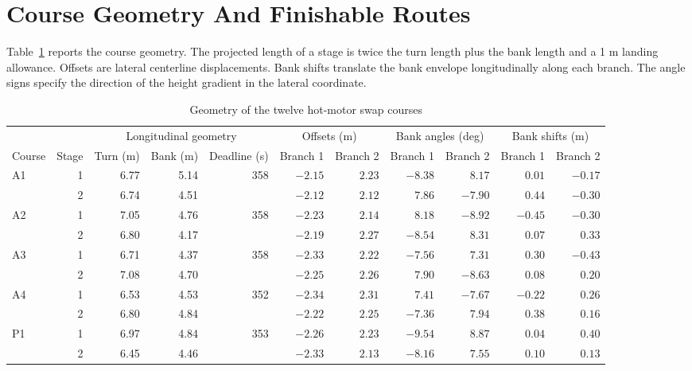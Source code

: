 \documentclass{ieeeaccess}
\begin{document}
\appendices

\section{Course Geometry And Finishable Routes}
\label{app:course-data}

Table~\ref{tab:geometry} reports the course geometry. The projected length of a stage is twice the turn length plus the bank length and a 1 m landing allowance. Offsets are lateral centerline displacements. Bank shifts translate the bank envelope longitudinally along each branch. The angle signs specify the direction of the height gradient in the lateral coordinate.

\begin{table}[!t]
\caption{Geometry of the twelve hot-motor swap courses}
\label{tab:geometry}
\centering
\footnotesize
\setlength{\tabcolsep}{8pt}
\renewcommand{\arraystretch}{1.12}
\begin{tabular}{@{}lrrrrrrrrrr@{}}
\hline
& & \multicolumn{3}{c}{Longitudinal geometry} & \multicolumn{2}{c}{Offsets (m)} & \multicolumn{2}{c}{Bank angles (deg)} & \multicolumn{2}{c}{Bank shifts (m)} \\
Course & Stage & Turn (m) & Bank (m) & Deadline (s) & Branch 1 & Branch 2 & Branch 1 & Branch 2 & Branch 1 & Branch 2 \\
\hline
A1 & 1 & 6.77 & 5.14 & 358 & $-2.15$ & $2.23$ & $-8.38$ & $8.17$ & $0.01$ & $-0.17$ \\
 & 2 & 6.74 & 4.51 &  & $-2.12$ & $2.12$ & $7.86$ & $-7.90$ & $0.44$ & $-0.30$ \\
A2 & 1 & 7.05 & 4.76 & 358 & $-2.23$ & $2.14$ & $8.18$ & $-8.92$ & $-0.45$ & $-0.30$ \\
 & 2 & 6.80 & 4.17 &  & $-2.19$ & $2.27$ & $-8.54$ & $8.31$ & $0.07$ & $0.33$ \\
A3 & 1 & 6.71 & 4.37 & 358 & $-2.33$ & $2.22$ & $-7.56$ & $7.31$ & $0.30$ & $-0.43$ \\
 & 2 & 7.08 & 4.70 &  & $-2.25$ & $2.26$ & $7.90$ & $-8.63$ & $0.08$ & $0.20$ \\
A4 & 1 & 6.53 & 4.53 & 352 & $-2.34$ & $2.31$ & $7.41$ & $-7.67$ & $-0.22$ & $0.26$ \\
 & 2 & 6.80 & 4.84 &  & $-2.22$ & $2.25$ & $-7.36$ & $7.94$ & $0.38$ & $0.16$ \\
\hline
P1 & 1 & 6.97 & 4.84 & 353 & $-2.26$ & $2.23$ & $-9.54$ & $8.87$ & $0.04$ & $0.40$ \\
 & 2 & 6.45 & 4.46 &  & $-2.33$ & $2.13$ & $-8.16$ & $7.55$ & $0.10$ & $0.13$ \\

\end{tabular}
\end{table}
\end{document}
